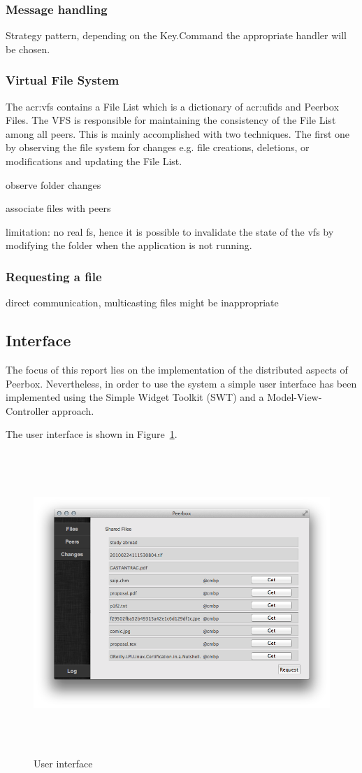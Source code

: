     
    \subsubsection{Message handling}
    Strategy pattern, depending on the Key.Command the appropriate handler will be chosen.
    
    \subsubsection{Virtual File System}
    
    The \gls{acr:vfs} contains a File List which is a dictionary of \glspl{acr:ufid} and Peerbox Files. The VFS is responsible for maintaining the consistency of the File List among all peers. This is mainly accomplished with two techniques. The first one by observing the file system for changes e.g. file creations, deletions, or modifications and updating the File List.
    
    observe folder changes
    

    
    associate files with peers
    
    limitation: no real fs, hence it is possible to invalidate the state of the vfs by modifying the folder when the application is not running. 
    
    \subsubsection{Requesting a file}
    direct communication, multicasting files might be inappropriate
        
    

\subsection{Interface}
The focus of this report lies on the implementation of the distributed aspects of Peerbox. Nevertheless, in order to use the system a simple user interface has been implemented using the Simple Widget Toolkit (SWT) and a Model-View-Controller approach. 

The user interface is shown in Figure~\ref{fig:figures_gui}.
\begin{figure}[htbp]
    \centering
        \includegraphics[height=4.5in]{figures/gui.png}
    \caption{User interface}
    \label{fig:figures_gui}
\end{figure}
